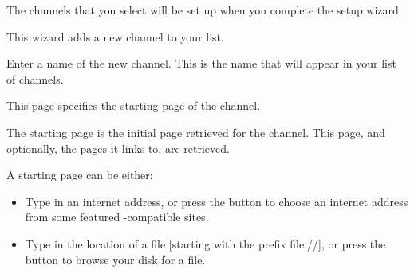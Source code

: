 The channels that you select will be set up when you complete the
setup wizard.


This wizard adds a new \brandingapplicationsuitename channel to your list.


Enter a name of the new channel. This is the name that will appear in your
list of channels.



This page specifies the starting page of the channel.

The starting page is the initial page retrieved for the channel. This page,
and optionally, the pages it links to, are retrieved.

A starting page can be either:

\begin{itemize}
  \item {} Type in an internet address, or press 
  the  button to choose an internet address 
  from some featured \brandingapplicationsuitename-compatible sites.

  \item {} Type in the location of a file [starting 
  with the prefix file://], or press the  button 
  to browse your disk for a file.
\end{itemize}


